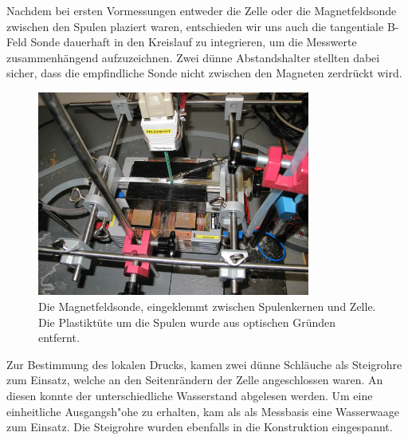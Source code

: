 \documentclass[11pt]{scrartcl}
\begin{document}
Nachdem bei ersten Vormessungen entweder die Zelle oder die Magnetfeldsonde zwischen den  Spulen plaziert waren, entschieden wir uns auch die tangentiale B-Feld Sonde dauerhaft in den Kreislauf zu integrieren, um die Messwerte zusammenh\"angend aufzuzeichnen. Zwei d\"unne Abstandshalter stellten dabei sicher, dass die empfindliche Sonde nicht zwischen den Magneten zerdr\"uckt wird.

\begin{figure}[ht]
\begin{center}
\includegraphics[width=0.8\textwidth]{images/offen.jpg}
\end{center}
\vspace{-1.5\baselineskip}
\caption{Die Magnetfeldsonde, eingeklemmt zwischen Spulenkernen und Zelle. Die Plastikt\"ute um die Spulen wurde aus optischen Gr\"unden entfernt.}
\label{offen}
\end{figure}

Zur Bestimmung des lokalen Drucks, kamen zwei d\"unne Schl\"auche als Steigrohre zum Einsatz, welche an den Seitenr\"andern der Zelle angeschlossen waren. An diesen konnte der unterschiedliche Wasserstand abgelesen werden. Um eine einheitliche Ausgangsh"ohe zu erhalten, kam als als Messbasis eine Wasserwaage zum Einsatz. Die Steigrohre wurden ebenfalls in die Konstruktion eingespannt.
\end{document}
